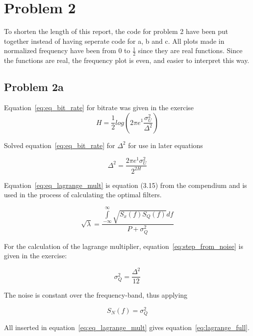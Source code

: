 \chapter{Problem 2}
To shorten the length of this report, the code for problem 2 have been put together instead of having seperate code for a, b and c. All plots made in normalized frequency have been from $0$ to $\frac{1}{2}$ since they are real functions. Since the functions are real, the frequency plot is even, and easier to interpret this way.
                          
\section{Problem 2a}
	
	
	Equation~\ref{eq:eq_bit_rate} for bitrate was given in the exercise 
	\begin{equation}
		H=\frac{1}{2}log(2\pi e^1\frac{\sigma ^2 _U}{\Delta ^2})
		\label{eq:eq_bit_rate}
	\end{equation}
	
	Solved equation~\ref{eq:eq_bit_rate} for $\Delta ^2$ for use in later equations
	
	\begin{equation}
		\Delta ^2=\frac{2\pi e^1\sigma ^2 _U}{2^{2H}}
		\label{eq:step_size}
	\end{equation}
	
	Equation~\ref{eq:eq_lagrange_mult} is equation (3.15) from the compendium and is used in the process of calculating the optimal filters.
	
	\begin{equation}
		\sqrt{\lambda}=\frac{\int\limits_{-\infty}^{\infty}\sqrt{S_x(f)S_Q(f)}df}{P+\sigma^2_Q}
		\label{eq:eq_lagrange_mult}
	\end{equation}
	
	For the calculation of the lagrange multiplier, equation~\ref{eq:step_from_noise} is given in the exercise:
	
	\begin{equation}
		\sigma^2_Q=\frac{\Delta^2}{12}
		\label{eq:step_from_noise}
	\end{equation}
	
	The noise is constant over the frequency-band, thus applying
	
	\begin{equation*}
		S_N(f)=\sigma^2_Q
	\end{equation*}
	
	All inserted in equation~\ref{eq:eq_lagrange_mult} gives equation~\ref{eq:lagrange_full}.

